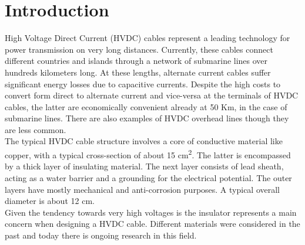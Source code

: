 \documentclass[11pt,a4paper]{article}
\begin{document}



\section{Introduction}
\label{sec:introduction}
High Voltage Direct Current (HVDC) cables represent a leading technology for power transmission on very long distances. Currently, these cables connect different countries and islands through a network of submarine lines over hundreds kilometers long. At these lengths, alternate current cables suffer significant energy losses due to capacitive currents. Despite the high costs to convert form direct to alternate current and vice-versa at the terminals of HVDC cables, the latter are economically convenient already at 50 Km, in the case of submarine lines. There are also examples of HVDC overhead lines though they are less common.\\
The typical HVDC cable structure involves a core of conductive material like copper, with a typical cross-section of about 15 cm\textsuperscript{2}. The latter is encompassed by a thick layer of insulating material. The next layer consists of lead sheath, acting as a water barrier and a grounding for the electrical potential. The outer layers have mostly mechanical and anti-corrosion purposes. A typical overall diameter is about 12 cm.\\
Given the tendency towards very high voltages is the insulator represents a main concern when designing a HVDC cable. Different materials were considered in the past and today there is ongoing research in this field.
\end{document}
